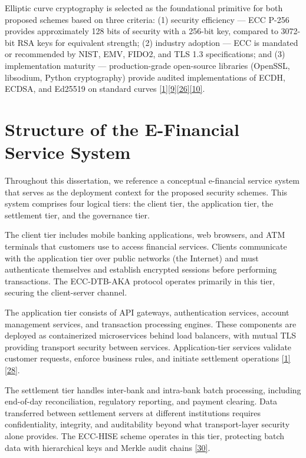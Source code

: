 \indent Elliptic curve cryptography is selected as the foundational primitive for both proposed schemes based on three criteria: (1) security efficiency --- ECC P-256 provides approximately 128 bits of security with a 256-bit key, compared to 3072-bit RSA keys for equivalent strength; (2) industry adoption --- ECC is mandated or recommended by NIST, EMV, FIDO2, and TLS 1.3 specifications; and (3) implementation maturity --- production-grade open-source libraries (OpenSSL, libsodium, Python cryptography) provide audited implementations of ECDH, ECDSA, and Ed25519 on standard curves \hyperref[ref:1]{[1]}\hyperref[ref:9]{[9]}\hyperref[ref:26]{[26]}\hyperref[ref:10]{[10]}.

\section{Structure of the E-Financial Service System}

\indent Throughout this dissertation, we reference a conceptual e-financial service system that serves as the deployment context for the proposed security schemes. This system comprises four logical tiers: the client tier, the application tier, the settlement tier, and the governance tier.

\indent The client tier includes mobile banking applications, web browsers, and ATM terminals that customers use to access financial services. Clients communicate with the application tier over public networks (the Internet) and must authenticate themselves and establish encrypted sessions before performing transactions. The ECC-DTB-AKA protocol operates primarily in this tier, securing the client-server channel.

\indent The application tier consists of API gateways, authentication services, account management services, and transaction processing engines. These components are deployed as containerized microservices behind load balancers, with mutual TLS providing transport security between services. Application-tier services validate customer requests, enforce business rules, and initiate settlement operations \hyperref[ref:1]{[1]}\hyperref[ref:28]{[28]}.

\indent The settlement tier handles inter-bank and intra-bank batch processing, including end-of-day reconciliation, regulatory reporting, and payment clearing. Data transferred between settlement servers at different institutions requires confidentiality, integrity, and auditability beyond what transport-layer security alone provides. The ECC-HISE scheme operates in this tier, protecting batch data with hierarchical keys and Merkle audit chains \hyperref[ref:30]{[30]}.

